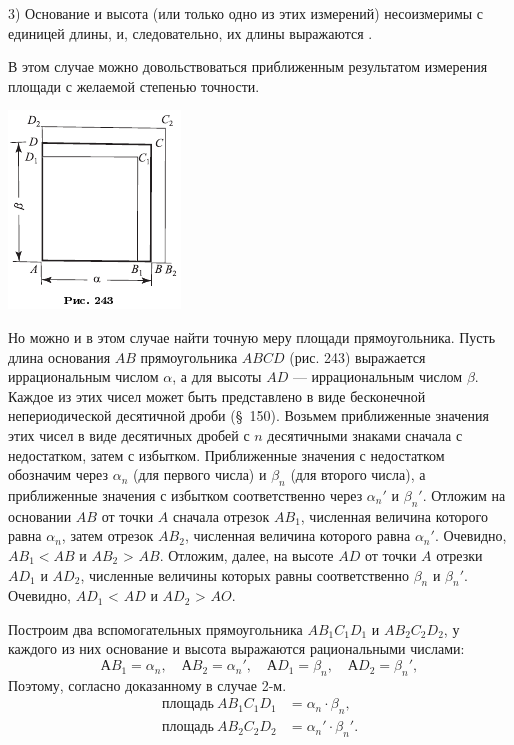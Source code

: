 \documentclass[oneside]{book}
\begin{document}
3) Основание и высота (или только одно из этих измерений) несоизмеримы с единицей длины, и, следовательно, их длины выражаются .

В этом случае можно довольствоваться приближенным результатом измерения площади с желаемой степенью точности.

\includegraphics{pics/ris-243}

Но можно и в этом случае найти точную меру площади прямоугольника.
Пусть длина основания $AB$ прямоугольника $ABCD$ (рис. 243) выражается иррациональным числом $\alpha$, а для высоты $AD$ — иррациональным числом $\beta$.
Каждое из этих чисел может быть представлено в виде бесконечной непериодической десятичной дроби (§~150).
Возьмем приближенные значения этих чисел в виде десятичных дробей с $n$ десятичными знаками сначала с недостатком, затем с избытком.
Приближенные значения с недостатком обозначим через $\alpha_n$ (для первого числа) и $\beta_n$ (для второго числа), а приближенные значения с избытком соответственно через  $\alpha_n'$ и $\beta_n'$.
Отложим на основании $AB$ от точки $A$ сначала отрезок $AB_1$, численная величина которого равна $\alpha_n$, затем отрезок $AB_2$, численная величина которого равна  $\alpha_n'$.
Очевидно, $AB_1<AB$ и $AB_2$ > $AB$.
Отложим, далее, на высоте $AD$ от точки $A$ отрезки $AD_1$ и $AD_2$, численные величины которых равны соответственно $\beta_n$ и $\beta_n'$.
Очевидно, $AD_1$ < $AD$ и $AD_2$ > $AO$.

Построим два вспомогательных прямоугольника $AB_1C_1D_1$ и $AB_2C_2D_2$, у каждого из них основание и высота выражаются рациональными числами:
\[АB_1=\alpha_n,
\quad
АB_2=\alpha_n',
\quad
АD_1=\beta_n,
\quad
АD_2=\beta_n',
\]
Поэтому, согласно доказанному в случае 2-м.
\begin{align*}
\text{площадь}~AB_1C_1D_1 &= \alpha_n\cdot \beta_n, 
\\
\text{площадь}~AB_2C_2D_2 &= \alpha_n'\cdot \beta_n'. 
\end{align*}
\end{document}
